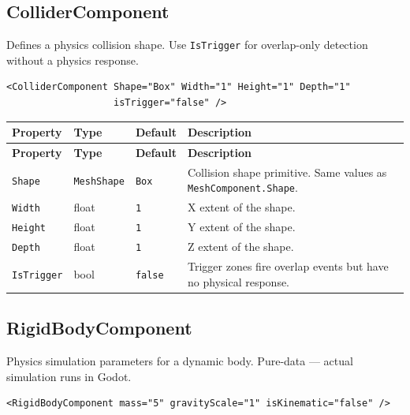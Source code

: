 \documentclass[11pt,a4paper]{article}
\begin{document}
\subsection{ColliderComponent}

Defines a physics collision shape. Use \texttt{IsTrigger} for overlap-only
detection without a physics response.

\begin{lstlisting}
<ColliderComponent Shape="Box" Width="1" Height="1" Depth="1"
                   isTrigger="false" />
\end{lstlisting}

\begin{longtable}{P{3cm} P{2.2cm} P{2.5cm} P{5.3cm}}
  \toprule
  \textbf{Property} & \textbf{Type} & \textbf{Default} & \textbf{Description} \\
  \midrule
  \endfirsthead
  \toprule
  \textbf{Property} & \textbf{Type} & \textbf{Default} & \textbf{Description} \\
  \midrule
  \endhead
  \texttt{Shape} & \texttt{MeshShape} & \texttt{Box} &
    Collision shape primitive. Same values as \texttt{MeshComponent.Shape}. \\
  \texttt{Width} & float & \texttt{1} & X extent of the shape. \\
  \texttt{Height} & float & \texttt{1} & Y extent of the shape. \\
  \texttt{Depth} & float & \texttt{1} & Z extent of the shape. \\
  \texttt{IsTrigger} & bool & \texttt{false} &
    Trigger zones fire overlap events but have no physical response. \\
  \bottomrule
\end{longtable}

\subsection{RigidBodyComponent}

Physics simulation parameters for a dynamic body. Pure-data --- actual
simulation runs in Godot.

\begin{lstlisting}
<RigidBodyComponent mass="5" gravityScale="1" isKinematic="false" />
\end{lstlisting}
\end{document}
